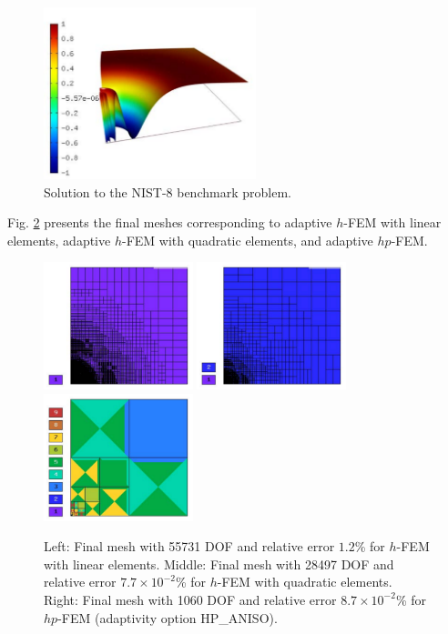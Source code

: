 \documentclass[12pt]{elsarticle}
\begin{document}
\begin{figure}[H]
\centering
\vspace{-3mm}
\includegraphics[height=5cm]{mafig47.pdf}
\caption{Solution to the NIST-8 benchmark problem.}
\label{fig:sln-nist08}
\end{figure}

Fig. \ref{fig:nist-8-hp-aniso} presents the final meshes corresponding to adaptive $h$-FEM with
linear elements, adaptive $h$-FEM with quadratic elements, and adaptive $hp$-FEM.

\begin{figure}[H]
\centering
\includegraphics[height=3.7cm]{mafig48.pdf}
\includegraphics[height=3.7cm]{mafig49.pdf}
\includegraphics[height=3.7cm]{mafig50.pdf}
\caption{
Left: Final mesh with 55731 DOF and relative error $1.2$\% for $h$-FEM with linear elements.
Middle: Final mesh with 28497 DOF and relative error $7.7\times10^{-2}$\% for $h$-FEM with quadratic elements.
Right: Final mesh with 1060 DOF and relative error $8.7\times10^{-2}$\% for $hp$-FEM (adaptivity option HP\_ANISO).}
\label{fig:nist-8-hp-aniso}
\end{figure}
\end{document}
